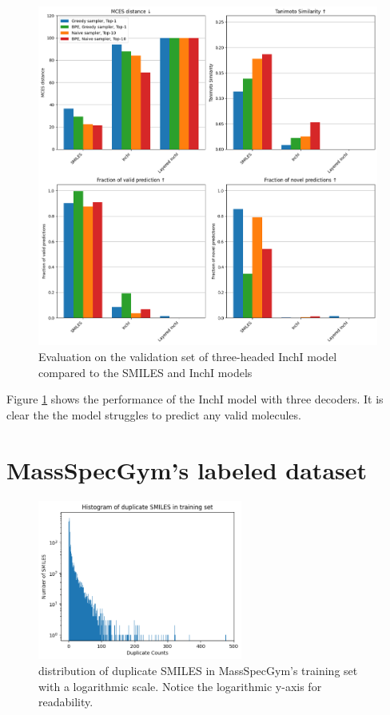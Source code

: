 \begin{figure}[H]
    \centering
    \includegraphics[width=1.0\textwidth]{figures/appendix/layered_inchi_with_tanimoto.png}
    \caption{Evaluation on the validation set of three-headed InchI model compared to the SMILES and InchI models}
    \label{fig:layered_inchi}
\end{figure}

Figure \ref{fig:layered_inchi} shows the performance of the InchI model with three decoders. It is clear the the model struggles to predict any valid molecules.

\section{MassSpecGym's labeled dataset}

\begin{figure}[H]
    \centering
    \includegraphics[width=0.6\textwidth]{figures/discussion/duplicate_smiles_training_set.png}
    \caption{distribution of duplicate SMILES in MassSpecGym's training set with a logarithmic scale. Notice the logarithmic y-axis for readability.}
    \label{fig:duplicate_smiles}
\end{figure}

